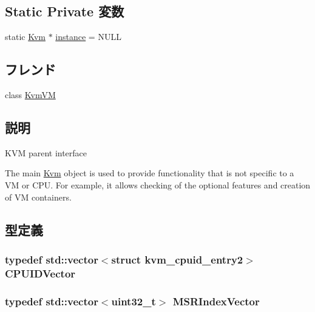 \subsection*{Static Private 変数}
\begin{DoxyCompactItemize}
\item 
static \hyperlink{classKvm}{Kvm} $\ast$ \hyperlink{classKvm_a64c6606364bd27581f929800703a402e}{instance} = NULL
\end{DoxyCompactItemize}
\subsection*{フレンド}
\begin{DoxyCompactItemize}
\item 
class \hyperlink{classKvm_a9210c8f6e282c397940f37aff4d6c32d}{KvmVM}
\end{DoxyCompactItemize}


\subsection{説明}
KVM parent interface

The main \hyperlink{classKvm}{Kvm} object is used to provide functionality that is not specific to a VM or CPU. For example, it allows checking of the optional features and creation of VM containers. 

\subsection{型定義}
\hypertarget{classKvm_af9d6fd6949b666ab0f41114891c201db}{
\subsubsection[{CPUIDVector}]{\setlength{\rightskip}{0pt plus 5cm}typedef {\bf std::vector}$<$struct kvm\_\-cpuid\_\-entry2$>$ {\bf CPUIDVector}}}
\label{classKvm_af9d6fd6949b666ab0f41114891c201db}
\hypertarget{classKvm_ab2ddfab51860a21d04f8ca0abe33a77f}{
\subsubsection[{MSRIndexVector}]{\setlength{\rightskip}{0pt plus 5cm}typedef {\bf std::vector}$<${\bf uint32\_\-t}$>$ {\bf MSRIndexVector}}}
\label{classKvm_ab2ddfab51860a21d04f8ca0abe33a77f}


